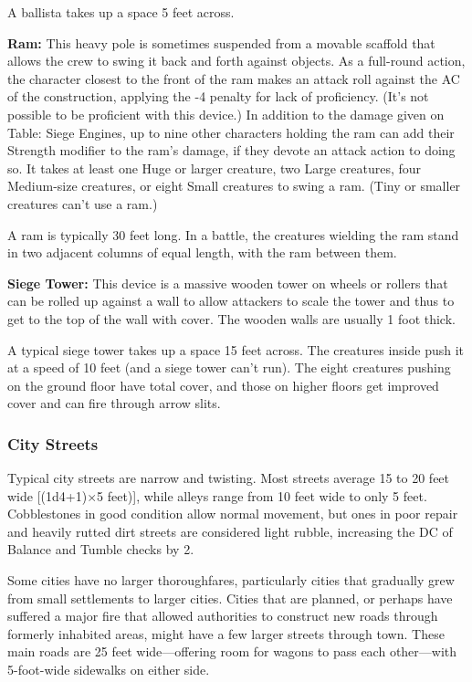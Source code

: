 \documentclass{article}
\begin{document}
A ballista takes up a space 5 feet across.

\textbf{Ram: }This heavy pole is sometimes suspended from a movable scaffold that 
allows the crew to swing it back and forth against objects. As a full-round action, 
the character closest to the front of the ram makes an attack roll against the 
AC of the construction, applying the -4 penalty for lack of proficiency. (It's 
not possible to be proficient with this device.) In addition to the damage given 
on Table: Siege Engines, up to nine other characters holding the ram can add their 
Strength modifier to the ram's damage, if they devote an attack action to doing 
so. It takes at least one Huge or larger creature, two Large creatures, four Medium-size 
creatures, or eight Small creatures to swing a ram. (Tiny or smaller creatures 
can't use a ram.)

A ram is typically 30 feet long. In a battle, the creatures wielding the ram stand 
in two adjacent columns of equal length, with the ram between them.

\textbf{Siege Tower: }This device is a massive wooden tower on wheels or rollers 
that can be rolled up against a wall to allow attackers to scale the tower and 
thus to get to the top of the wall with cover. The wooden walls are usually 1 foot 
thick.

A typical siege tower takes up a space 15 feet across. The creatures inside push 
it at a speed of 10 feet (and a siege tower can't run). The eight creatures pushing 
on the ground floor have total cover, and those on higher floors get improved cover 
and can fire through arrow slits.

\vspace{12pt}
\subsubsection*{\textbf{City Streets}}

Typical city streets are narrow and twisting. Most streets average 15 to 20 feet 
wide [(1d4+1)\ensuremath{\times}5 feet)], while alleys range from 10 feet wide 
to only 5 feet. Cobblestones in good condition allow normal movement, but ones 
in poor repair and heavily rutted dirt streets are considered light rubble, increasing 
the DC of Balance and Tumble checks by 2.

Some cities have no larger thoroughfares, particularly cities that gradually grew 
from small settlements to larger cities. Cities that are planned, or perhaps have 
suffered a major fire that allowed authorities to construct new roads through formerly 
inhabited areas, might have a few larger streets through town. These main roads 
are 25 feet wide---offering room for wagons to pass each other---with 5-foot-wide 
sidewalks on either side.
\end{document}

